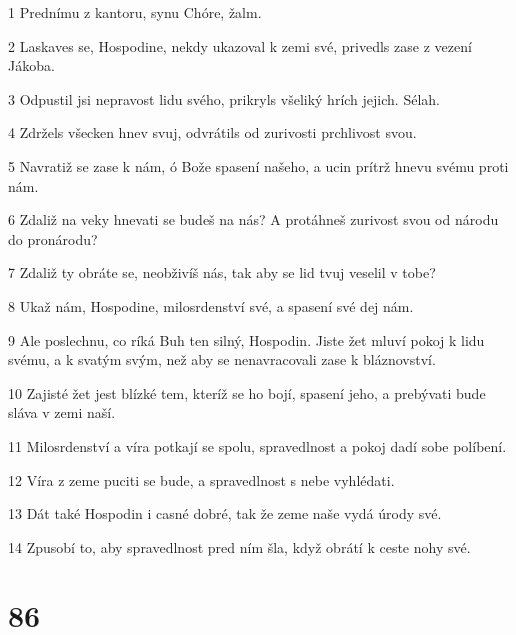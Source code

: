 \par 1 Prednímu z kantoru, synu Chóre, žalm.
\par 2 Laskaves se, Hospodine, nekdy ukazoval k zemi své, privedls zase z vezení Jákoba.
\par 3 Odpustil jsi nepravost lidu svého, prikryls všeliký hrích jejich. Sélah.
\par 4 Zdržels všecken hnev svuj, odvrátils od zurivosti prchlivost svou.
\par 5 Navratiž se zase k nám, ó Bože spasení našeho, a ucin prítrž hnevu svému proti nám.
\par 6 Zdaliž na veky hnevati se budeš na nás? A protáhneš zurivost svou od národu do pronárodu?
\par 7 Zdaliž ty obráte se, neobživíš nás, tak aby se lid tvuj veselil v tobe?
\par 8 Ukaž nám, Hospodine, milosrdenství své, a spasení své dej nám.
\par 9 Ale poslechnu, co ríká Buh ten silný, Hospodin. Jiste žet mluví pokoj k lidu svému, a k svatým svým, než aby se nenavracovali zase k bláznovství.
\par 10 Zajisté žet jest blízké tem, kteríž se ho bojí, spasení jeho, a prebývati bude sláva v zemi naší.
\par 11 Milosrdenství a víra potkají se spolu, spravedlnost a pokoj dadí sobe políbení.
\par 12 Víra z zeme puciti se bude, a spravedlnost s nebe vyhlédati.
\par 13 Dát také Hospodin i casné dobré, tak že zeme naše vydá úrody své.
\par 14 Zpusobí to, aby spravedlnost pred ním šla, když obrátí k ceste nohy své.

\chapter{86}

